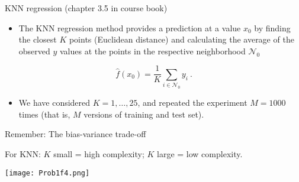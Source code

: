\documentclass[10pt,ignorenonframetext,]{beamer}
\providecommand{\tightlist}{%
  \setlength{\itemsep}{0pt}\setlength{\parskip}{0pt}}
\begin{document}
\begin{frame}

\begin{block}{KNN regression (chapter 3.5 in course book)}

\vspace{2mm}

\begin{itemize}
\tightlist
\item
  The KNN regression method provides a prediction at a value \(x_0\) by
  finding the closest \(K\) points (Euclidean distance) and calculating
  the average of the observed \(y\) values at the points in the
  respective neighborhood \(\mathcal{N}_0\)
\end{itemize}

\[\hat{f}(x_0)=\frac{1}{K}\sum_{i\in \mathcal{N}_0} y_i \ .\]

\vspace{2mm}

\begin{itemize}
\tightlist
\item
  We have considered \(K=1,\ldots,25\), and repeated the experiment
  \(M=1000\) times (that is, \(M\) versions of training and test set).
\end{itemize}

\end{block}

\end{frame}

\begin{frame}

\begin{block}{Remember: The bias-variance trade-off}

\vspace{2mm}

For KNN: \(K\) small = high complexity; \(K\) large = low complexity.

\vspace{2mm}

\centering

\texttt{[image: Prob1f4.png]}

\end{block}

\end{frame}
\end{document}
